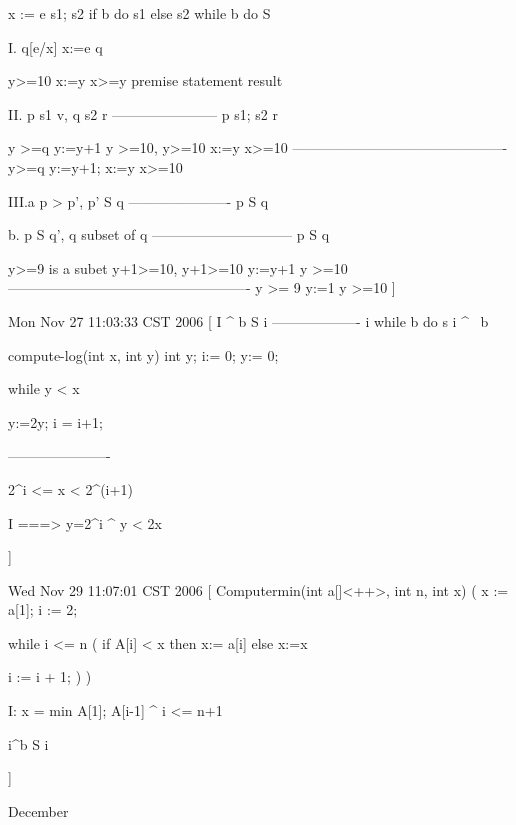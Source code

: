 \documentclass[a4paper]{article}
\begin{document}
{	x := e
	s1; s2
	if b do s1 else s2
	while b do S

I.	{q[e/x]} x:=e   {q}

	{y>=10} x:=y  {x>=y}
     premise  statement  result

II.	{p} s1 {v}, {q} s2 {r}
	-----------------------
	  {p} s1; s2 {r}

	{y >=q} y:=y+1 {y >=10}, {y>=10} x:=y {x>=10}
	----------------------------------------------
	 {y>=q} y:=y+1; x:=y    {x>=10}

III.a  p > p', {p'} S {q}
	  ----------------------
	   {p} S {q}

	b.  {p} S {q'}, q subset of q
	------------------------------
	{p} S {q}


	y>=9 is a subet y+1>=10, {y+1>=10} y:=y+1  {y >=10}
	----------------------------------------------------
	{y >= 9} y:=1  {y >=10}
]


Mon Nov 27 11:03:33 CST 2006
[
{I ^ b} S {i}
-------------------
{i} while b do s {i ^ ~b}

compute-log(int x, int y)
 int y;
   i:= 0;
   y:= 0;

   while y < x
   
     y:=2y;
	 i = i+1;
   
----------------------

2^i <= x < 2^(i+1)


I ===>  y=2^i ^ y < 2x 


]


Wed Nov 29 11:07:01 CST 2006
[
  Computermin(int a[]<++>, int n, int x)
  (
  	x := a[1];
	i := 2;

	while i <= n
	(
		if A[i] < x then x:= a[i]
		else	x:=x

		i := i + 1;
	)
  )

I:  	x = min {A[1]; A[i-1]} ^ i <= n+1

{i^b} S {i}

]

}
December
\end{document}
